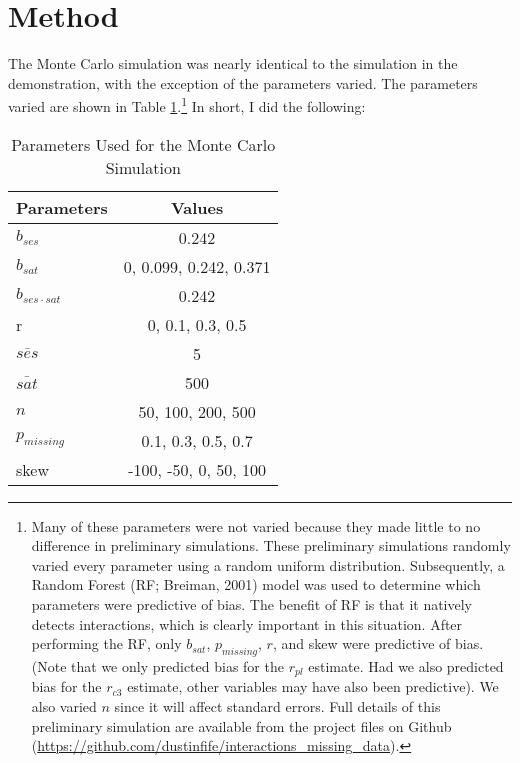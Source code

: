 \documentclass[english,man]{apa6}
\theoremstyle{definition}
\theoremstyle{definition}
\theoremstyle{remark}
\begin{document}
\section{Method}\label{method}

The Monte Carlo simulation was nearly identical to the simulation in the
demonstration, with the exception of the parameters varied. The
parameters varied are shown in Table \ref{tab:mcparams}.\footnote{Many
  of these parameters were not varied because they made little to no
  difference in preliminary simulations. These preliminary simulations
  randomly varied every parameter using a random uniform distribution.
  Subsequently, a Random Forest (RF; Breiman, 2001) model was used to
  determine which parameters were predictive of bias. The benefit of RF
  is that it natively detects interactions, which is clearly important
  in this situation. After performing the RF, only \(b_{sat}\),
  \(p_{missing}\), \(r\), and skew were predictive of bias. (Note that
  we only predicted bias for the \(r_{pl}\) estimate. Had we also
  predicted bias for the \(r_{c3}\) estimate, other variables may have
  also been predictive). We also varied \(n\) since it will affect
  standard errors. Full details of this preliminary simulation are
  available from the project files on Github
  (\url{https://github.com/dustinfife/interactions_missing_data}).} In
short, I did the following:

\begin{table}[ht]
\centering
\caption{Parameters Used for the Monte Carlo Simulation} 
\label{tab:mcparams}
\begin{tabular}{lc}
  \hline
Parameters & Values \\ 
  \hline
$b_{ses}$ & 0.242 \\ 
  $b_{sat}$ & 0, 0.099, 0.242, 0.371 \\ 
  $b_{ses\cdot sat}$ & 0.242 \\ 
  r & 0, 0.1, 0.3, 0.5 \\ 
  $\bar{ses}$ & 5 \\ 
  $\bar{sat}$ & 500 \\ 
  $n$ & 50, 100, 200, 500 \\ 
  $p_{missing}$ & 0.1, 0.3, 0.5, 0.7 \\ 
  skew & -100, -50, 0, 50, 100 \\ 
   \hline
\end{tabular}
\end{table}
\end{document}
